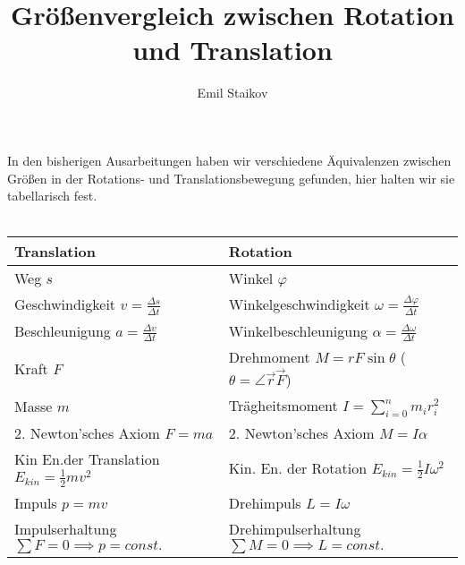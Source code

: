\documentclass[11pt]{article}
\title{Größenvergleich zwischen Rotation und Translation}
\author{Emil Staikov}
\date{}
\begin{document}
\maketitle
In den bisherigen Ausarbeitungen haben wir verschiedene Äquivalenzen zwischen Größen in der Rotations- und Translationsbewegung gefunden, hier halten wir sie tabellarisch fest. \\\\
\begin{center}
    \begin{tabular}{|l|l|}
        \hline
        \textbf{Translation} & \textbf{Rotation} \\
        \hline
        Weg $s$ & Winkel $\varphi$ \\
        \hline
        Geschwindigkeit $v = \frac{\Delta s}{\Delta t}$ & Winkelgeschwindigkeit $\omega = \frac{\Delta \varphi}{\Delta t}$ \\
        \hline 
        Beschleunigung $a = \frac{\Delta v}{\Delta t}$ & Winkelbeschleunigung $\alpha = \frac{\Delta \omega}{\Delta t}$ \\
        \hline  
        Kraft $F$ & Drehmoment $M = rF\sin\theta$ ($\theta = \angle\vec{r}\vec{F}$) \\ 
        \hline 
        Masse $m$ & Trägheitsmoment $I = \sum_{i=0}^n m_ir_i^2$ \\ 
        \hline 
        2. Newton'sches Axiom $F = ma$ & 2. Newton'sches Axiom $M=I\alpha$ \\ 
        \hline 
        Kin En.der Translation $E_{kin} = \frac{1}{2} m v^2$ & Kin. En. der Rotation $E_{kin} = \frac{1}{2}I\omega^2$ \\ 
        \hline 
        Impuls $p = mv$ & Drehimpuls $L = I\omega$ \\
        \hline 
        Impulserhaltung $\sum F = 0 \implies p = const.$ & Drehimpulserhaltung $\sum M = 0 \implies L = const.$\\
        \hline 
    \end{tabular}
\end{center}
\end{document}
